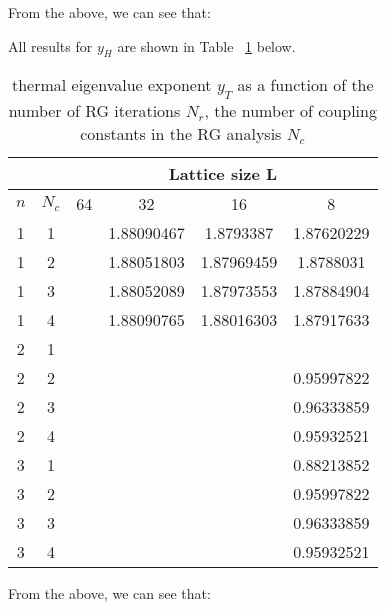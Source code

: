 \documentclass{article}
\begin{document}
From the above, we can see that: 


All results for $y_H$ are shown in Table ~\ref{yH} below.

\begin{table}[H]
\centering
\begin{tabular}{|c|c|c|c|c|c|} 
\hline
 \multicolumn{2}{|c|}{ }& \multicolumn{4}{c|}{Lattice size L}\\
 \hline
 $n$ & $N_c$ & 64 & 32 & 16 & 8 \\
 \hline
 1 & 1 & & 1.88090467 & 1.8793387 & 1.87620229\\
 1 & 2 & & 1.88051803 & 1.87969459 & 1.8788031\\
 1 & 3 & & 1.88052089 & 1.87973553 & 1.87884904\\
 1 & 4 & & 1.88090765 & 1.88016303 & 1.87917633\\
 \hline
 2 & 1 & & & & \\
 2 & 2 & & & & 0.95997822\\
 2 & 3 & & & & 0.96333859\\
 2 & 4 & & & & 0.95932521\\
 \hline
 3 & 1 & & & & 0.88213852\\
 3 & 2 & & & & 0.95997822\\
 3 & 3 & & & & 0.96333859\\
 3 & 4 & & & & 0.95932521\\
 \hline
 \end{tabular}
 \caption{\label{yH}thermal eigenvalue
exponent $y_T$ as a function of the number of RG iterations $N_r$, the number of coupling
constants in the RG analysis $N_c$}
\end{table}

From the above, we can see that: 



\end{document}
